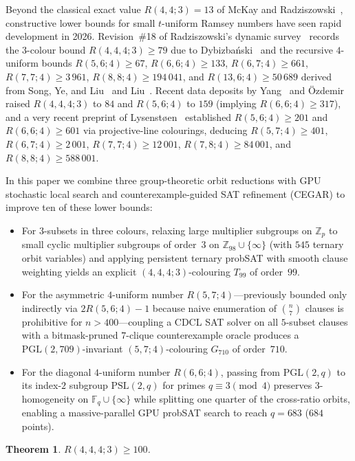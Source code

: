\documentclass[11pt]{article}
\newtheorem{theorem}{Theorem}
\theoremstyle{remark}
\newcommand{\F}{\mathbb{F}}
\newcommand{\Z}{\mathbb{Z}}
\begin{document}
Beyond the classical exact value $R(4,4;3)=13$ of McKay and
Radziszowski~\cite{mr1}, constructive lower bounds for small $t$-uniform Ramsey
numbers have seen rapid development in 2026. Revision~\#18 of Radziszowski's
dynamic survey~\cite[Section~7.1]{survey} records the $3$-colour bound
$R(4,4,4;3)\ge 79$ due to Dybizba\'nski~\cite{dyb3} and the recursive
$4$-uniform bounds $R(5,6;4)\ge 67$, $R(6,6;4)\ge 133$, $R(6,7;4)\ge 661$,
$R(7,7;4)\ge 3\,961$, $R(8,8;4)\ge 194\,041$, and $R(13,6;4)\ge 50\,689$ derived
from Song, Ye, and Liu~\cite{sonyl} and Liu~\cite{liu}. Recent data deposits by
Yang~\cite{yang} and \"Ozdemir~\cite{ozdemir} raised $R(4,4,4;3)$ to $84$ and
$R(5,6;4)$ to $159$ (implying $R(6,6;4)\ge 317$), and a very recent preprint of
Lysenst{\o}en~\cite{lysenstoen} established $R(5,6;4)\ge 201$ and
$R(6,6;4)\ge 601$ via projective-line colourings, deducing $R(5,7;4)\ge 401$,
$R(6,7;4)\ge 2\,001$, $R(7,7;4)\ge 12\,001$, $R(7,8;4)\ge 84\,001$, and
$R(8,8;4)\ge 588\,001$.

In this paper we combine three group-theoretic orbit reductions with GPU
stochastic local search and counterexample-guided SAT refinement (CEGAR) to
improve ten of these lower bounds:
\begin{itemize}
\item For $3$-subsets in three colours, relaxing large multiplier subgroups on
  $\Z_p$ to small cyclic multiplier subgroups of order~$3$ on
  $\Z_{98}\cup\{\infty\}$ (with $545$ ternary orbit variables) and applying
  persistent ternary probSAT with smooth clause weighting yields an explicit
  $(4,4,4;3)$-colouring $T_{99}$ of order~$99$.
\item For the asymmetric $4$-uniform number $R(5,7;4)$---previously bounded
  only indirectly via $2R(5,6;4)-1$ because naive enumeration of $\binom{n}{7}$
  clauses is prohibitive for $n>400$---coupling a CDCL SAT solver on all
  $5$-subset clauses with a bitmask-pruned $7$-clique counterexample oracle
  produces a $\mathrm{PGL}(2,709)$-invariant $(5,7;4)$-colouring $G_{710}$ of
  order~$710$.
\item For the diagonal $4$-uniform number $R(6,6;4)$, passing from
  $\mathrm{PGL}(2,q)$ to its index-$2$ subgroup $\mathrm{PSL}(2,q)$ for primes
  $q\equiv 3\pmod 4$ preserves $3$-homogeneity on $\F_q\cup\{\infty\}$ while
  splitting one quarter of the cross-ratio orbits, enabling a massive-parallel
  GPU probSAT search to reach $q=683$ ($684$ points).
\end{itemize}

\begin{theorem}\label{thm:three}
$R(4,4,4;3)\ge 100$.
\end{theorem}
\end{document}
